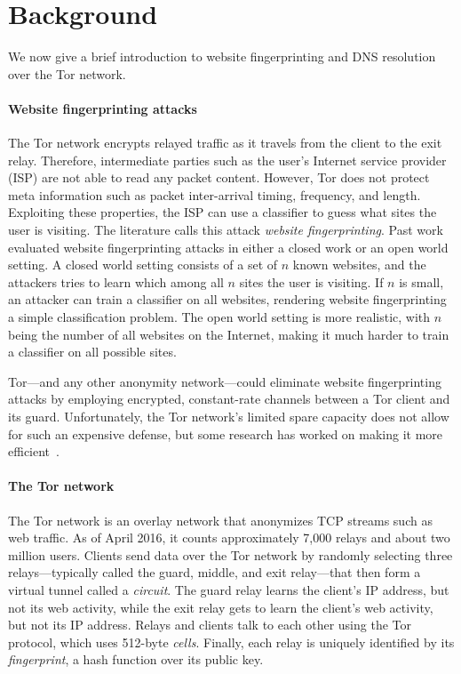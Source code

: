 \section{Background}
\label{sec:background}
We now give a brief introduction to website fingerprinting and DNS resolution
over the Tor network.

\paragraph{Website fingerprinting attacks}
The Tor network encrypts relayed traffic as it travels from the client to the
exit relay.  Therefore, intermediate parties such as the user's Internet service
provider (ISP) are not able to read any packet content.  However, Tor does not
protect meta information such as packet inter-arrival timing, frequency, and
length.  Exploiting these properties, the ISP can use a classifier to guess what
sites the user is visiting.  The literature calls this attack \emph{website
fingerprinting}.  Past work evaluated website fingerprinting attacks in either a
closed work or an open world setting.  A closed world setting consists of a set
of $n$ known websites, and the attackers tries to learn which among all $n$
sites the user is visiting.  If $n$ is small, an attacker can train a classifier
on all websites, rendering website fingerprinting a simple classification
problem.  The open world setting is more realistic, with $n$ being the number of
all websites on the Internet, making it much harder to train a classifier on all
possible sites. 

Tor---and any other anonymity network---could eliminate website fingerprinting
attacks by employing encrypted, constant-rate channels between a Tor client and
its guard.  Unfortunately, the Tor network's limited spare capacity does not
allow for such an expensive defense, but some research has worked on making it
more efficient~\cite{Cai2014a,DBLP:journals/corr/JuarezIPDW15,WangThesis}.

\paragraph{The Tor network}
The Tor network is an overlay network that anonymizes TCP streams such as web
traffic.  As of April 2016, it counts approximately 7,000 relays and about two
million users.  Clients send data over the Tor network by randomly selecting
three relays---typically called the guard, middle, and exit relay---that then
form a virtual tunnel called a \emph{circuit}.  The guard relay learns the
client's IP address, but not its web activity, while the exit relay gets to
learn the client's web activity, but not its IP address.  Relays and clients
talk to each other using the Tor protocol, which uses 512-byte \emph{cells}.
Finally, each relay is uniquely identified by its \emph{fingerprint}, a hash
function over its public key.

